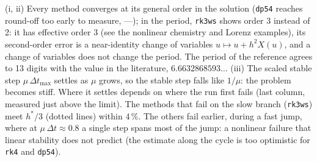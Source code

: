 \documentclass[11pt,a4paper]{article}
\begin{document}
(i, ii) Every method converges at its general order in the solution
(\texttt{dp54} reaches round-off too early to measure, ---); in the period,
\texttt{rk3ws} shows order 3 instead of 2: it has effective order 3 (see the
nonlinear chemistry and Lorenz examples), its second-order error is a
near-identity change of variables $u \mapsto u + h^2X(u)$, and a change of
variables does not change the period. The period of the reference agrees to 13 digits with the
value in the literature, $6.6632868593\dots$ (iii) The scaled stable step
$\mu\,\Delta t_{\max}$ settles as $\mu$ grows, so the stable step falls like
$1/\mu$: the problem becomes stiff. Where it settles depends on where the
run first fails (last column, measured just above the limit). The methods
that fail on the slow branch (\texttt{rk3ws}) meet $h^*/3$ (dotted lines)
within $4\,\%$. The others fail
earlier, during a fast jump, where at $\mu\,\Delta t \approx 0.8$ a single
step spans most of the jump: a nonlinear failure that linear stability does
not predict (the estimate along the cycle is too optimistic for \texttt{rk4}
and \texttt{dp54}).
\end{document}
